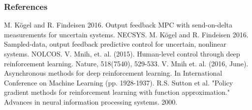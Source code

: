 \documentclass{beamer}
\begin{document}
\begin{frame}
\frametitle{References}
\footnotesize{
\begin{thebibliography}{99}
 M. K\"{o}gel and R. Findeisen 2016. Output feedback MPC with send-on-delta measurements for 
uncertain systems. NECSYS.
 M. K\"{o}gel and R. Findeisen 2016. Sampled-data, output feedback predictive control for uncertain,
nonlinear systems. NOLCOS.
  V. Mnih, et. al. (2015). 
 Human-level control through deep reinforcement learning. Nature, 518(7540), 529-533.
  V. Mnih et. al. (2016, June). Asynchronous methods for deep reinforcement learning. 
 In International Conference on Machine Learning (pp. 1928-1937).
  R.S. Sutton et al. "Policy gradient methods for reinforcement learning with function approximation." 
 Advances in neural information processing systems. 2000.
\end{thebibliography}
}
\end{frame}

\end{document}

